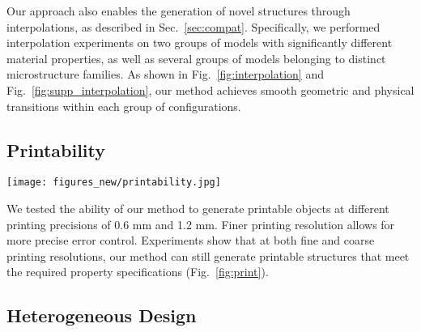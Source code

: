 Our approach also enables the generation of novel structures through interpolations, as described in Sec.~\ref{sec:compat}. 
Specifically, we performed interpolation experiments on two groups of models with significantly different material properties, as well as several groups of models belonging to distinct microstructure families.
As shown in Fig.~\ref{fig:interpolation} and Fig.~\ref{fig:supp_interpolation}, our method achieves smooth geometric and physical transitions within each group of configurations.




\setlength{\belowcaptionskip}{5pt}

\subsection{Printability}

\begin{figure*}
    \centering
    \texttt{[image: figures\_new/printability.jpg]}
    \caption{(a) and (b) show two generated microstructures under different printing precisions, along with their property error distributions visualized as heatmaps. 
    (c) and (d) present the printed results corresponding to (a) and (b).
    The two test models used a $4 \times 4 \times 1$ grid of microstructures, each with a cell size of 20 mm.
    The experiments were conducted with printer precision settings of 0.6 mm and 1.2 mm, corresponding to detection resolutions of $32^3$ and $16^3$.
    The smallest feature sizes in the first and second test cases were \textbf{0.62 mm} and \textbf{1.25 mm}, respectively, with property errors of \textbf{0.2\%} and \textbf{0.4\%}.
    For the first structure, the smallest feature size was 0.62 mm, while the second structure exhibited a minimum feature size of 1.25 mm.}
    \label{fig:print}
\end{figure*} 

We tested the ability of our method to generate printable objects at different printing precisions of 0.6 mm and 1.2 mm.
Finer printing resolution allows for more precise error control.
Experiments show that at both fine and coarse printing resolutions, our method can still generate printable structures that meet the required property specifications (Fig.~\ref{fig:print}).



\subsection{Heterogeneous Design}


